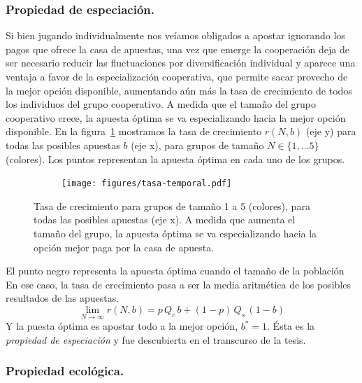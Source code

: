 \documentclass[a4paper,11pt]{book}
\theoremstyle{definition}
\begin{document}
\subsubsection{Propiedad de especiaci\'on.}
Si bien jugando individualmente nos ve\'iamos obligados a apostar ignorando los pagos que ofrece la casa de apuestas, una vez que emerge la cooperaci\'on deja de ser necesario reducir las fluctuaciones por diversificaci\'on individual y aparece una ventaja a favor de la especializaci\'on cooperativa, que permite sacar provecho de la mejor opci\'on disponible, aumentando a\'un m\'as la tasa de crecimiento de todos los individuos del grupo cooperativo.
%
A medida que el tama\~no del grupo cooperativo crece, la apuesta \'optima se va especializando hacia la mejor opci\'on disponible.
%
En la figura~\ref{fig:esp} mostramos la tasa de crecimiento $r(N,b)$ (eje y) para todas las posibles apuestas $b$ (eje x), para grupos de tama\~no $N \in \{1,\dots 5\}$ (colores).
%
Los puntos representan la apuesta \'optima en cada uno de los grupos.
%
\begin{figure}[ht!]
\centering
  \begin{subfigure}[c]{0.45\textwidth}
\begin{flushright}
 \texttt{[image: figures/tasa-temporal.pdf]}
 \end{flushright}
 \end{subfigure}
 \caption{
Tasa de crecimiento para grupos de tama\~no 1 a 5 (colores), para todas las posibles apuestas (eje x). A medida que aumenta el tama\~no del grupo, la apuesta \'optima se va especializando hacia la opci\'on mejor paga por la casa de apuesta.
 }
 \label{fig:esp}
 \vspace{-0.1cm}
 \end{figure}
%
El punto negro representa la apuesta \'optima cuando el tama\~no de la poblaci\'on
%
En ese caso, la tasa de crecimiento pasa a ser la media aritm\'etica de los posibles resultados de las apuestas.
%
\begin{equation}
\lim_{N \rightarrow \infty} r(N,b) = p \,  Q_c  \, b + (1-p) \, Q_s  \, (1-b)
\end{equation}
%
Y la puesta \'optima es apostar todo a la mejor opci\'on, $b^* =1$.
%
\'Esta es la \emph{propiedad de especiaci\'on} y fue descubierta en el transcurso de la tesis.

\subsubsection{Propiedad ecol\'ogica.}
\end{document}
